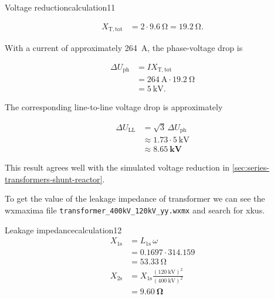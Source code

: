 \begin{calculation}{Voltage reduction}{calculation11}

	\begin{align}
		X_{\mathrm{T,tot}} &= 2 \cdot \SI{9.6}{\ohm}
		= \SI{19.2}{\ohm}.
	\end{align}
	
	With a current of approximately \SI{264}{\ampere}, the phase-voltage drop is
	
	\begin{align}
		\Delta U_{\mathrm{ph}}
		&= I X_{\mathrm{T,tot}} \\
		&= \SI{264}{\ampere} \cdot \SI{19.2}{\ohm} \\
		&= \SI{5}{\kilo\volt}.
	\end{align}
	
	The corresponding line-to-line voltage drop is approximately
	
    \begin{align}
	\Delta U_{\mathrm{LL}}
	&= \sqrt{3}\,\Delta U_{\mathrm{ph}} \\
	&\approx 1.73 \cdot \SI{5}{\kilo\volt} \\
    &\approx\boxed{\mathbf{\SI{8.65}{\kilo\volt}}}
    \end{align}
	
	This result agrees well with the simulated voltage reduction in \cref{sec:series-transformers-shunt-reactor}.\\
\end{calculation}



\noindent To get the value of the leakage impedance of transformer 
we can see the wxmaxima file \texttt{transformer\_400kV\_120kV\_yy.wxmx} and search for xkus.

\begin{calculation}{Leakage impedance}{calculation12}
    \begin{align}
	X_{1\mathrm{s}}
	&= L_{1\mathrm{s}}\,\omega \nonumber\\
	&= 0.1697 \cdot 314.159 \nonumber\\
	&= \SI{53.33}{\ohm} \\[2ex]
	X_{2\mathrm{s}}
	&= X_{1\mathrm{s}}
	\frac{(\SI{120}{\kilo\volt})^{2}}
	{(\SI{400}{\kilo\volt})^{2}}
	\nonumber\\
	&= \boxed{\mathbf{\SI{9.60}{\ohm}}} 
	\label{eq:eqn1_9}
    \end{align}
\end{calculation}

